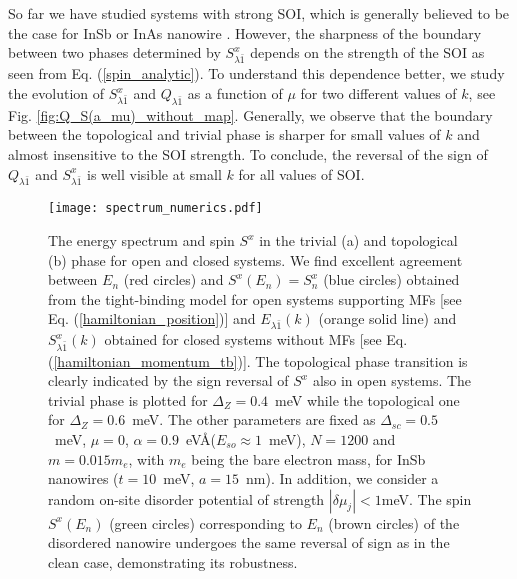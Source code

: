 \documentclass[prl,twocolumn,showpacs,floatfix,amsbsy,amsbsy,superscriptaddress]{revtex4-1}
\begin{document}
So far we have studied systems with strong SOI, which is generally believed to be the case for InSb or InAs nanowire \cite{Mourik}. However, the sharpness of the boundary between two phases determined by $S^x_{\lambda \bar 1}$ depends on the strength of the SOI as seen from Eq. (\ref{spin_analytic}). To understand this dependence better, we study the evolution of $S^x_{\lambda \bar 1}$ and $Q_{\lambda \bar 1}$ as a function of $\mu$ for two different values of $k$, see Fig. \ref{fig:Q_S(a_mu)_without_map}. Generally, we observe that the boundary between the topological and  trivial phase is sharper for small values of $k$ and almost insensitive to the SOI strength. To conclude, the reversal of the sign of  $Q_{\lambda \bar 1}$ and  $S^x_{\lambda \bar 1}$  is well visible at small $k$ for all values of SOI.



\begin{figure}[t]
\centering
\texttt{[image: spectrum\_numerics.pdf]}
\caption{The energy spectrum and spin $S^x$ in the trivial (a) and  topological (b) phase for open and closed systems.  We find excellent agreement between $E_n$ (red circles) and $S^x(E_n)=S^x_n$ (blue circles) obtained from the tight-binding model for open systems supporting MFs [see Eq. (\ref{hamiltonian_position})] and $E_{\lambda\bar1}(k)$ (orange solid line) and $S^x_{\lambda\bar1}(k)$ obtained for closed systems  without MFs [see Eq. (\ref{hamiltonian_momentum_tb})].  The topological phase transition is clearly indicated by the sign reversal of $S^x$ also in  open systems.
The trivial phase is plotted for $\Delta_Z=0.4$~meV while the topological one for $\Delta_Z=0.6$~meV. The other parameters are fixed as $\Delta_{sc}=0.5$~meV, $\mu=0$, 
$\alpha=0.9$~eV\AA  ($E_{so}\approx1$~meV),
$N=1200$ and $m=0.015m_e$, with $m_e$ being the bare electron mass, for InSb nanowires ($t=10$~meV, $a=15$~nm). 
In addition, we consider a random on-site disorder potential of  strength $|\delta \mu_j| < 1$meV.
The spin $S^x(E_n)$ (green circles) corresponding to $E_n$ (brown circles) of the disordered nanowire undergoes the same reversal of  sign as  in the clean case, demonstrating its robustness.  }
  \label{fig:spectrum_numerics}
\end{figure}
\end{document}
